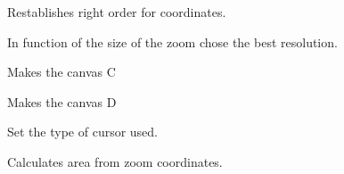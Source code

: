 \documentclass[letterpaper,10pt,openany,oneside]{sphinxmanual}
\begin{document}
\begin{fulllineitems}
\begin{fulllineitems}
\label{rst/visu2d:Visu.display.DISPLAY.right_order_coord}
Restablishes right order for coordinates.

\end{fulllineitems}


\begin{fulllineitems}
\label{rst/visu2d:Visu.display.DISPLAY.select_best_resolution}
In function of the size of the zoom chose the best resolution.

\end{fulllineitems}


\begin{fulllineitems}
\label{rst/visu2d:Visu.display.DISPLAY.set_canvasC}
Makes the canvas C

\end{fulllineitems}


\begin{fulllineitems}
\label{rst/visu2d:Visu.display.DISPLAY.set_canvasD}
Makes the canvas D

\end{fulllineitems}


\begin{fulllineitems}
\label{rst/visu2d:Visu.display.DISPLAY.setcursor}
Set the type of cursor used.

\end{fulllineitems}


\begin{fulllineitems}
\label{rst/visu2d:Visu.display.DISPLAY.zoom_area}
Calculates area from zoom coordinates.

\end{fulllineitems}


\end{fulllineitems}
\end{document}
